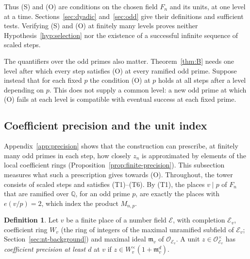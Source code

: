 \documentclass[11pt]{article}
\theoremstyle{plain}
\theoremstyle{definition}
\newtheorem{definition}[theorem]{Definition}
\theoremstyle{remark}
\newcommand{\Q}{\mathbb Q}
\newcommand{\OO}{\mathcal O}
\begin{document}
Thus (S) and (O) are conditions on the chosen field $F_n$ and its units,
at one level at a time.  Sections~\ref{sec:dyadic} and~\ref{sec:odd} give
their definitions and sufficient tests.  Verifying (S) and (O) at finitely
many levels proves neither Hypothesis~\ref{hyp:selection}
nor the existence of a successful infinite sequence of scaled steps.

The quantifiers over the odd primes also matter.  Theorem~\ref{thm:B}
needs one level after which every step satisfies (O) at every ramified
odd prime.  Suppose instead that for each fixed $p$ the condition (O) at
$p$ holds at all steps after a level depending on $p$.  This does not
supply a common level: a new odd prime at which (O) fails at each level
is compatible with eventual success at each fixed prime.

\subsection{Coefficient precision and the unit index}
\label{sec:selection-precision}
Appendix~\ref{app:precision} shows that the construction can prescribe,
at finitely many odd primes in each step, how closely $z_n$ is
approximated by elements of the local coefficient rings
(Proposition~\ref{prop:finite-precision}).  This subsection measures what
such a prescription gives towards (O).  Throughout, the tower consists of
scaled steps and satisfies \textup{(T1)--(T6)}.  By (T1), the places
$v\mid p$ of $F_n$ that are ramified over $\Q$, for an odd prime $p$, are
exactly the places with $e(v/p)=2$, which index the product $M_{n,p}$.

\begin{definition}\label{def:coefficient-precision}
Let $v$ be a finite place of a number field $\mathcal E$, with completion
$\mathcal E_v$, coefficient ring $W_v$ (the ring of integers of the
maximal unramified subfield of $\mathcal E_v$;
Section~\ref{sec:nt-background}) and maximal ideal $\mathfrak m_v$ of
$\OO_{\mathcal E_v}$.  A unit $z\in\OO_{\mathcal E_v}^\times$ has
\emph{coefficient precision at least $d$} at $v$ if
$z\in W_v^\times(1+\mathfrak m_v^d)$.
\end{definition}
\end{document}

